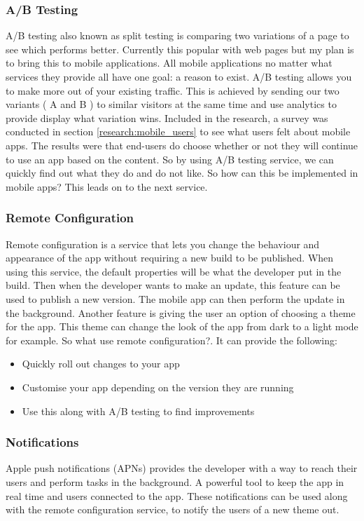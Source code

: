 \subsubsection{A/B Testing} \label{design:abtesting}
A/B testing also known as split testing is comparing two variations of a page to see which performs better. Currently this popular with web pages but my plan is to bring this to mobile applications. All mobile applications no matter what services they provide all have one goal: a reason to exist. A/B testing allows you to make more out of your existing traffic. This is achieved by sending our two variants ( A and B ) to similar visitors at the same time and use analytics to provide display what variation wins. Included in the research, a survey was conducted in section \ref{research:mobile_users} to see what users felt about mobile apps. The results were that end-users do choose whether or not they will continue to use an app based on the content. So by using A/B testing service, we can quickly find out what they do and do not like. So how can this be implemented in mobile apps? This leads on to the next service.

\subsubsection{Remote Configuration} \label{d-p:remote_config}
Remote configuration is a service that lets you change the behaviour and appearance of the app without requiring a new build to be published. When using this service, the default properties will be what the developer put in the build. Then when the developer wants to make an update, this feature can be used to publish a new version. The mobile app can then perform the update in the background. Another feature is giving the user an option of choosing a theme for the app. This theme can change the look of the app from dark to a light mode for example. So what use remote configuration?. It can provide the following:

\begin{itemize}
  \item Quickly roll out changes to your app
  \item Customise your app depending on the version they are running
  \item Use this along with A/B testing to find improvements
\end{itemize}

\subsubsection{Notifications} \label{d-p:notifications}
Apple push notifications (APNs) provides the developer with a way to reach their users and perform tasks in the background. A powerful tool to keep the app in real time and users connected to the app. These notifications can be used along with the remote configuration service, to notify the users of a new theme out.

